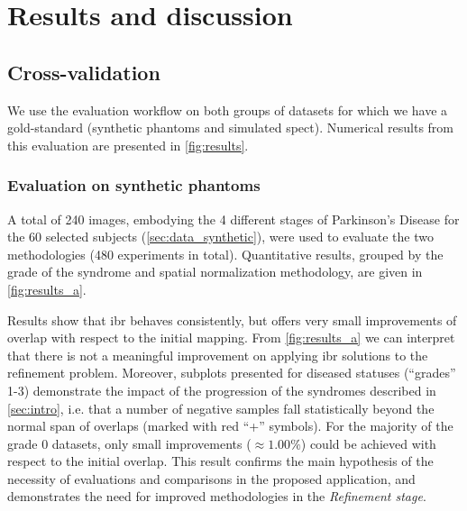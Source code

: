 \documentclass{frontiers}
\begin{document}
\section{Results and discussion}
\label{sec:results}

\subsection{Cross-validation}
\label{sec:results_test}
We use the evaluation workflow on both groups of datasets
  for which we have a gold-standard (synthetic phantoms and simulated \gls*{spect}).
Numerical results from this evaluation are presented in \autoref{fig:results}.

\subsubsection{Evaluation on synthetic phantoms}
\label{sec:results_phantoms}
A total of 240 images, embodying the 4 different stages
  of Parkinson's Disease for the 60 selected subjects
  (\autoref{sec:data_synthetic}), were used to evaluate
  the two methodologies (480 experiments in total).
Quantitative results, grouped by the grade of the
  syndrome and spatial normalization methodology, 
  are given in \autoref{fig:results_a}.

Results show that \gls*{ibr} behaves consistently,
  but offers very small improvements of overlap with respect to the
  initial mapping.
From \autoref{fig:results_a} we can interpret that there is not 
  a meaningful improvement on applying \gls*{ibr} solutions to 
  the refinement problem.
Moreover, subplots presented for diseased statuses (``grades'' 1-3) 
  demonstrate the impact of the progression of the syndromes described in 
  \autoref{sec:intro}, i.e. that a number of negative samples fall 
   statistically beyond the normal span of overlaps (marked with red ``+'' symbols).
For the majority of the grade 0 datasets, only small improvements ($\approx1.00\%$)
  could be achieved with respect to the initial overlap.
This result confirms the main hypothesis of the necessity of evaluations and
  comparisons in the proposed application, and demonstrates the need for 
  improved methodologies in the \emph{Refinement stage}.
  
\end{document}
